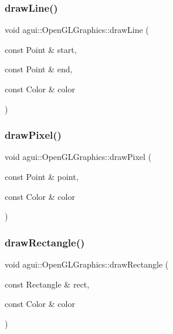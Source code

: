\subsubsection{\texorpdfstring{draw\+Line()}{drawLine()}}
{\footnotesize\ttfamily void agui\+::\+Open\+G\+L\+Graphics\+::draw\+Line (\begin{DoxyParamCaption}\item[{const Point \&}]{start,  }\item[{const Point \&}]{end,  }\item[{const Color \&}]{color }\end{DoxyParamCaption})\hspace{0.3cm}{\ttfamily [override]}}

\mbox{\label{classagui_1_1_open_g_l_graphics_a333364e89726e8f7248e050c3bb8ee5a}} 
\subsubsection{\texorpdfstring{draw\+Pixel()}{drawPixel()}}
{\footnotesize\ttfamily void agui\+::\+Open\+G\+L\+Graphics\+::draw\+Pixel (\begin{DoxyParamCaption}\item[{const Point \&}]{point,  }\item[{const Color \&}]{color }\end{DoxyParamCaption})\hspace{0.3cm}{\ttfamily [override]}}

\mbox{\label{classagui_1_1_open_g_l_graphics_a88a6af03611b93169c197167c2c014fe}} 
\subsubsection{\texorpdfstring{draw\+Rectangle()}{drawRectangle()}}
{\footnotesize\ttfamily void agui\+::\+Open\+G\+L\+Graphics\+::draw\+Rectangle (\begin{DoxyParamCaption}\item[{const Rectangle \&}]{rect,  }\item[{const Color \&}]{color }\end{DoxyParamCaption})\hspace{0.3cm}{\ttfamily [override]}}

